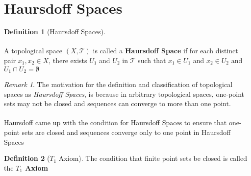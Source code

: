 \documentclass{article}
\theoremstyle{remark}
\newtheorem*{remark}{Remark}
\theoremstyle{definition}
\newtheorem{definition}{Definition}[section]
\begin{document}
\newpage

\section{Haursdoff Spaces}
\bigskip
\begin{definition}[Haursdoff Spaces]
\\ \\
A topological space $(X, \mathcal{T})$ is called a \textbf{Haursdoff Space} if for each distinct pair $x_1, x_2 \in X$, there exists $U_1$ and $U_2$ in $\mathcal{T}$ such that $x_1 \in U_1$ and $x_2 \in U_2$ and $U_1 \cap U_2 = \emptyset$
\end{definition}
\medskip
\begin{remark}
The motivation for the definition and classification of topological spaces as \textit{Haursdoff Spaces}, is because in arbitrary topological spaces, one-point sets may not be closed and sequences can converge to more than one point. 
\\ \\
Haursdoff came up with the condition for Haursdoff Spaces to ensure that one-point sets are closed and sequences converge only to one point in Haursdoff Spaces
\end{remark}

\begin{definition}[$T_1$ Axiom]
The condition that finite point sets be closed is called the \textbf{$T_1$ Axiom}

\end{definition}
\end{document}
